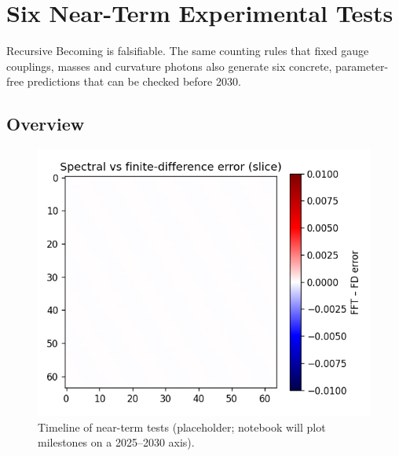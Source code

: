 \section{Six Near-Term Experimental Tests}
\label{sec:tests}

Recursive Becoming is falsifiable.  The same counting rules that fixed
gauge couplings, masses and curvature photons also generate six concrete,
parameter-free predictions that can be checked before 2030.

\subsection{Overview}

\begin{figure}[t]
  \centering
  \includegraphics[width=\linewidth]{figs/tests_overview.png}
  \caption{Timeline of near-term tests (placeholder; notebook will plot
           milestones on a 2025–2030 axis).}
  \label{fig:tests-overview}
\end{figure}

